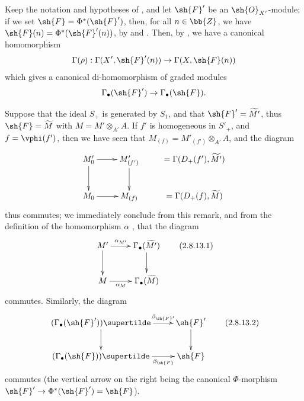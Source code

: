 \begin{env}[2.8.13]
\label{II.2.8.13}
Keep the notation and hypotheses of , and let $\sh{F}'$ be an $\sh{O}_{X'}$-module;
if we set $\sh{F}=\Phi^*(\sh{F}')$, then, for all $n\in\bb{Z}$, we have $\sh{F}(n)=\Phi^*(\sh{F}'(n))$, by  and .
Then, by , we have a canonical homomorphism
\[
  \Gamma(\rho): \Gamma(X',\sh{F}'(n)) \to \Gamma(X,\sh{F}(n))
\]
which gives a canonical di-homomorphism of graded modules
\[
  \Gamma_\bullet(\sh{F}') \to \Gamma_\bullet(\sh{F}).
\]

Suppose that the ideal $S_+$ is generated by $S_1$, and that $\sh{F}'=\widetilde{M'}$, thus $\sh{F}=\widetilde{M}$ with $M=M'\otimes_{A'}A$.
If $f'$ is homogeneous in $S'_+$, and $f=\vphi(f')$, then we have seen that $M_{(f)}=M'_{(f')}\otimes_{A'}A$, and the diagram
\[
  \xymatrix{
    M'_0 \ar[r] \ar[d]
    & M'_{(f')} \ar[d]
    & =\Gamma(D_+(f'),\widetilde{M'})
  \\M_0 \ar[r]
    & M_{(f)}
    & =\Gamma(D_+(f),\widetilde{M})
  }
\]
thus commutes;
we immediately conclude from this remark, and from the definition of the homomorphism $\alpha$ , that the diagram
\[
\label{II.2.8.13.1}
  \xymatrix{
    M' \ar[r]^-{\alpha_{M'}} \ar[d]
    & \Gamma_\bullet(\widetilde{M'}) \ar[d]
  \\M \ar[r]_-{\alpha_M}
    & \Gamma_\bullet(\widetilde{M})
  }
\tag{2.8.13.1}
\]
commutes.
Similarly, the diagram
\[
\label{II.2.8.13.2}
  \xymatrix{
    (\Gamma_\bullet(\sh{F}'))\supertilde \ar[r]^-{\beta_{\sh{F}'}} \ar[d]
    & \sh{F}' \ar[d]
  \\(\Gamma_\bullet(\sh{F}))\supertilde \ar[r]_-{\beta_{\sh{F}}}
    & \sh{F}
  }
\tag{2.8.13.2}
\]
commutes (the vertical arrow on the right being the canonical $\Phi$-morphism $\sh{F}'\to\Phi^*(\sh{F}')=\sh{F}$).
\end{env}


